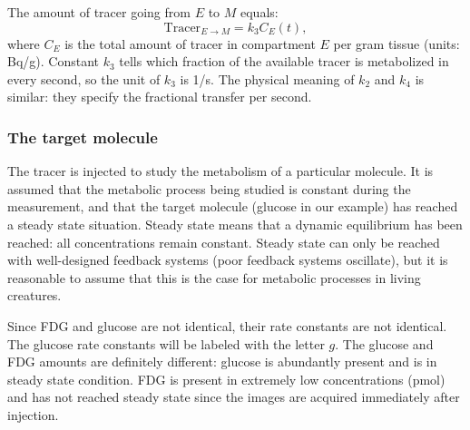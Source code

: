 The amount of tracer going from $E$ to $M$ equals:
\begin{equation}
  \mbox{Tracer}_{E \rightarrow M} = k_3 C_E(t),
\end{equation}
where $C_E$ is the total amount of tracer in compartment $E$ per gram tissue
(units: Bq/g). Constant $k_3$ tells which fraction of the available tracer is
metabolized in every second, so the unit of $k_3$ is 1/s. The physical meaning
of $k_2$ and $k_4$ is similar: they specify the fractional transfer per
second.

\subsubsection{The target molecule}
The tracer is injected to study the metabolism of a particular molecule. It is
assumed that the metabolic process being studied is constant during the
measurement, and that the target molecule (glucose in our example) has reached
a steady state situation. Steady state means that a dynamic equilibrium has
been reached: all concentrations remain constant. Steady state can only be
reached with well-designed feedback systems (poor feedback systems oscillate),
but it is reasonable to assume that this is the case for metabolic processes
in living creatures.

Since FDG and glucose are not identical, their rate constants are not
identical.  The glucose rate constants will be labeled with the letter
$g$. The glucose and FDG amounts are definitely different: glucose is
abundantly present and is in steady state condition. FDG is present in
extremely low concentrations (pmol) and has not reached steady state since the
images are acquired immediately after injection.

